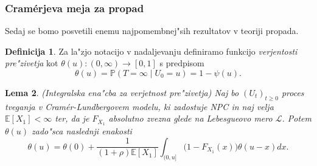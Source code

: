\documentclass[12pt, a4paper, reqno]{amsart}
\theoremstyle{definition}
\newtheorem{definicija}{Definicija}[section]
\theoremstyle{plain}
\newtheorem{lema}[definicija]{Lema}
\newcommand{\E}{\mathbb{E}}
\newcommand{\Prob}{\mathbb{P}}
\newcommand{\1}{\mathds{1}}
\begin{document}
        \subsubsection{Cramérjeva meja za propad}
            Sedaj se bomo posvetili enemu najpomembnej"sih rezultatov v teoriji propada.

            \begin{definicija}
                Za la"zjo notacijo v nadaljevanju definiramo funkcijo \textit{verjentosti pre"zivetja} kot
                $\theta(u):(0, \infty) \to [0, 1]$ s predpisom
                \begin{equation*}
                    \theta(u) = \Prob\left(T=\infty\mid U_0=u\right) = 1 - \psi(u).
                \end{equation*}
                \label{def:verjetnostPrezivetja}
            \end{definicija}

            \begin{lema}(Integralska ena"cba za verjetnost pre"zivetja)
                Naj bo $(U_t)_{t\geq0}$ proces tveganja v Cramér-Lundbergovem modelu, ki zadostuje NPC in naj 
                velja $\E\left[X_1\right]<\infty$ ter, da je $F_{X_1}$ absolutno zvezna glede na Lebesgueovo mero $\mathcal{L}$.
                Potem $\theta(u)$ zado"sca naslednji enakosti
                \begin{equation}
                    \theta(u) = \theta(0) + \frac{1}{(1+\rho)\E\left[X_1\right]} \int_{(0, u]}\bigl(1 - F_{X_1}(x)\bigr)\theta(u - x)dx.
                    \label{eq:verjetnostPrezivetja}
                \end{equation}
                \label{lema:verjetnostPrezivetja}
            \end{lema}
\end{document}
